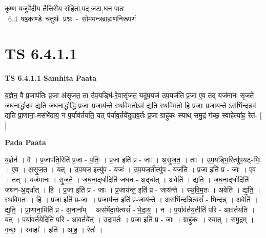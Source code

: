 \documentclass[17pt]{extarticle}
\begin{document}
\begin{titlepage}
    \begin{center}
 
\begin{sanskrit}
    { \Huge
    कृष्ण यजुर्वेदीय तैत्तिरीय संहिता,पद,जटा,घन पाठः 
    }
    \\
    \vspace{2.5cm}
    \mbox{ \Huge
    6.4       षष्ठकाण्डे चतुर्थः प्रश्नः - सोममन्त्रब्राह्मणनिरूपणं   }
\end{sanskrit}
\end{center}

\end{titlepage}
\tableofcontents
\pagebreak

\section*{ TS 6.4.1.1 }

\textbf{TS 6.4.1.1 } \newline
\textbf{Samhita Paata} \newline

य॒ज्ञेन॒ वै प्र॒जाप॑तिः प्र॒जा अ॑सृजत॒ ता उ॑प॒यड्भि॑-रे॒वासृ॑जत॒ यदु॑प॒यज॑ उप॒यज॑ति प्र॒जा ए॒व तद् यज॑मानः सृजते जघना॒र्द्धादव॑ द्यति जघना॒र्द्धाद्धि प्र॒जाः प्र॒जाय॑न्ते स्थविम॒तोऽव॑ द्यति स्थविम॒तो हि प्र॒जाः प्र॒जाय॒न्ते ऽस॑भिंन्द॒न्नव॑ द्यति प्रा॒णाना॒-मस॑भेंदाय॒ न प॒र्याव॑र्तयति॒ यत् प॑र्याव॒र्तये॑दुदाव॒र्तः प्र॒जा ग्राहु॑कः स्याथ् समु॒द्रं ग॑च्छ॒ स्वाहेत्या॑ह॒ रेत॑- [  ] \newline

\textbf{Pada Paata} \newline

य॒ज्ञेन॑ । वै । प्र॒जाप॑ति॒रिति॑ प्र॒जा - प॒तिः॒ । प्र॒जा इति॑ प्र - जाः । अ॒सृ॒ज॒त॒ । ताः । उ॒प॒यड्भि॒रित्यु॑प॒यट्-भिः॒ । ए॒व । अ॒सृ॒ज॒त॒ । यत् । उ॒प॒यज॒ इत्यु॑प - यजः॑ । उ॒प॒यज॒तीत्यु॑प - यज॑ति । प्र॒जा इति॑ प्र - जाः । ए॒व । तत् । यज॑मानः । सृ॒ज॒ते॒ । ज॒घ॒ना॒द्‌र्धादिति॑ जघन - अ॒द्‌र्धात् । अवेति॑ । द्य॒ति॒ । ज॒घ॒ना॒द्‌र्धादिति॑ जघन-अ॒द्‌र्धात् । हि । प्र॒जा इति॑ प्र - जाः । प्र॒जाय॑न्त॒ इति॑ प्र - जाय॑न्ते । स्थ॒वि॒म॒तः । अवेति॑ । द्य॒ति॒ । स्थ॒वि॒म॒तः । हि । प्र॒जा इति॑ प्र-जाः । प्र॒जाय॑न्त॒ इति॑ प्र-जाय॑न्ते । अस॑भिंन्द॒न्नित्यसं᳚ - भि॒न्द॒न्न् । अवेति॑ । द्य॒ति॒ । प्रा॒णाना॒मिति॑ प्र - अ॒नाना᳚म् । अस॑भेंदा॒येत्यसं᳚ - भे॒दा॒य॒ । न । प॒र्याव॑र्तय॒तीति॑ परि - आव॑र्तयति । यत् । प॒र्या॒व॒र्तये॒दिति॑ परि - आ॒व॒र्तये᳚त् । उ॒दा॒व॒र्तः । प्र॒जा इति॑ प्र - जाः । ग्राहु॑कः । स्या॒त् । स॒मु॒द्रम् । ग॒च्छ॒ । स्वाहा᳚ । इति॑ । आ॒ह॒ । रेतः॑ ।  \newline
\end{document}
